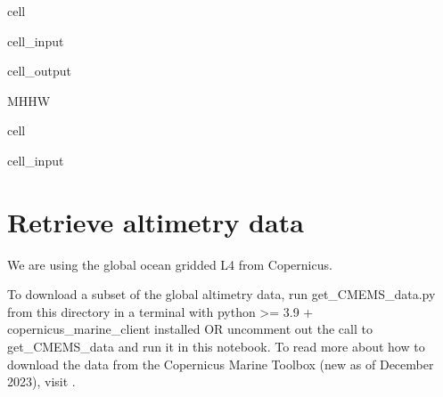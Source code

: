 \documentclass[letterpaper,10pt,english]{jupyterBook}
\begin{document}
\begin{sphinxuseclass}{cell}
\begin{sphinxVerbatimInput}
\begin{sphinxuseclass}{cell_input}
\end{sphinxuseclass}\end{sphinxVerbatimInput}
\begin{sphinxVerbatimOutput}

\begin{sphinxuseclass}{cell_output}
\begin{sphinxVerbatim}[commandchars=\\\{\}]
\PYGZsq{}MHHW\PYGZsq{}
\end{sphinxVerbatim}

\end{sphinxuseclass}\end{sphinxVerbatimOutput}

\end{sphinxuseclass}
\begin{sphinxuseclass}{cell}\begin{sphinxVerbatimInput}

\begin{sphinxuseclass}{cell_input}
\begin{sphinxVerbatim}[commandchars=\\\{\}]
  
\end{sphinxVerbatim}

\end{sphinxuseclass}\end{sphinxVerbatimInput}

\end{sphinxuseclass}

\part{Retrieve altimetry data}
\label{\detokenize{notebooks/SL_Data_Wrangling:retrieve-altimetry-data}}
\sphinxAtStartPar
We are using the global ocean gridded L4  from Copernicus.

\sphinxAtStartPar
To download a subset of the global altimetry data, run get\_CMEMS\_data.py from this directory in a terminal with python >= 3.9 + copernicus\_marine\_client installed OR uncomment out the call to get\_CMEMS\_data and run it in this notebook. To read more about how to download the data from the Copernicus Marine Toolbox (new as of December 2023), visit .
\end{document}
